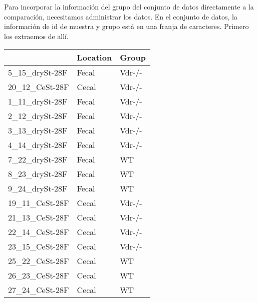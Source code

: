 \documentclass[
]{article}
\newenvironment{Shaded}{\begin{snugshade}}{\end{snugshade}}
\newcommand{\AttributeTok}[1]{\textcolor[rgb]{0.77,0.63,0.00}{#1}}
\newcommand{\DecValTok}[1]{\textcolor[rgb]{0.00,0.00,0.81}{#1}}
\newcommand{\FunctionTok}[1]{\textcolor[rgb]{0.00,0.00,0.00}{#1}}
\newcommand{\NormalTok}[1]{#1}
\newcommand{\OtherTok}[1]{\textcolor[rgb]{0.56,0.35,0.01}{#1}}
\newcommand{\SpecialCharTok}[1]{\textcolor[rgb]{0.00,0.00,0.00}{#1}}
\newcommand{\StringTok}[1]{\textcolor[rgb]{0.31,0.60,0.02}{#1}}
\begin{document}
Para incorporar la información del grupo del conjunto de datos
directamente a la comparación, necesitamos administrar los datos. En el
conjunto de datos, la información de id de muestra y grupo está en una
franja de caracteres. Primero los extraemos de allí.

\begin{Shaded}
\end{Shaded}

\begin{longtable}[]{@{}lll@{}}
\toprule()
& Location & Group \\
\midrule()
\endhead
5\_15\_drySt-28F & Fecal & Vdr-/- \\
20\_12\_CeSt-28F & Cecal & Vdr-/- \\
1\_11\_drySt-28F & Fecal & Vdr-/- \\
2\_12\_drySt-28F & Fecal & Vdr-/- \\
3\_13\_drySt-28F & Fecal & Vdr-/- \\
4\_14\_drySt-28F & Fecal & Vdr-/- \\
7\_22\_drySt-28F & Fecal & WT \\
8\_23\_drySt-28F & Fecal & WT \\
9\_24\_drySt-28F & Fecal & WT \\
19\_11\_CeSt-28F & Cecal & Vdr-/- \\
21\_13\_CeSt-28F & Cecal & Vdr-/- \\
22\_14\_CeSt-28F & Cecal & Vdr-/- \\
23\_15\_CeSt-28F & Cecal & Vdr-/- \\
25\_22\_CeSt-28F & Cecal & WT \\
26\_23\_CeSt-28F & Cecal & WT \\
27\_24\_CeSt-28F & Cecal & WT \\
\bottomrule()
\end{longtable}
\end{document}
